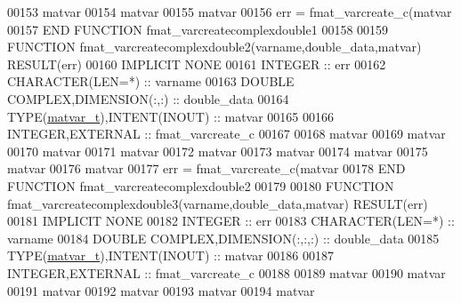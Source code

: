 \begin{DoxyCode}
00153     matvar%
00154     matvar%
00155     matvar%
00156     err = fmat\_varcreate\_c(matvar%
00157 \textcolor{keyword}{END FUNCTION }fmat\_varcreatecomplexdouble1
00158 
00159 \textcolor{keyword}{FUNCTION }fmat\_varcreatecomplexdouble2(varname,double\_data,matvar) \textcolor{keyword}{RESULT}(err)
00160 \textcolor{keywordtype}{IMPLICIT NONE}
00161     \textcolor{keywordtype}{INTEGER}                         :: err
00162     \textcolor{keywordtype}{CHARACTER(LEN=*)}                :: varname
00163     \textcolor{keywordtype}{DOUBLE COMPLEX},\textcolor{keywordtype}{DIMENSION(:,:)}   :: double\_data
00164     \textcolor{keywordtype}{TYPE}(\hyperlink{group___m_a_t_structmatvar__t}{matvar\_t}),\textcolor{keywordtype}{INTENT(INOUT)}    :: matvar
00165 
00166     \textcolor{keywordtype}{INTEGER},\textcolor{keywordtype}{EXTERNAL}                :: fmat\_varcreate\_c
00167 
00168     matvar%
00169     matvar%
00170     matvar%
00171     matvar%
00172     matvar%
00173     matvar%
00174     matvar%
00175     matvar%
00176     matvar%
00177     err = fmat\_varcreate\_c(matvar%
00178 \textcolor{keyword}{END FUNCTION }fmat\_varcreatecomplexdouble2
00179 
00180 \textcolor{keyword}{FUNCTION }fmat\_varcreatecomplexdouble3(varname,double\_data,matvar) \textcolor{keyword}{RESULT}(err)
00181 \textcolor{keywordtype}{IMPLICIT NONE}
00182     \textcolor{keywordtype}{INTEGER}                         :: err
00183     \textcolor{keywordtype}{CHARACTER(LEN=*)}                :: varname
00184     \textcolor{keywordtype}{DOUBLE COMPLEX},\textcolor{keywordtype}{DIMENSION(:,:,:)} :: double\_data
00185     \textcolor{keywordtype}{TYPE}(\hyperlink{group___m_a_t_structmatvar__t}{matvar\_t}),\textcolor{keywordtype}{INTENT(INOUT)}    :: matvar
00186 
00187     \textcolor{keywordtype}{INTEGER},\textcolor{keywordtype}{EXTERNAL}                :: fmat\_varcreate\_c
00188 
00189     matvar%
00190     matvar%
00191     matvar%
00192     matvar%
00193     matvar%
00194     matvar%

\end{DoxyCode}
